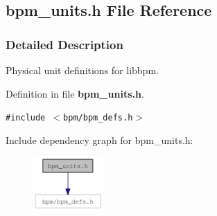\subsection{bpm\_\-units.h File Reference}
\label{bpm__units_8h}


\subsubsection{Detailed Description}
Physical unit definitions for libbpm. 



Definition in file {\bf bpm\_\-units.h}.

{\tt \#include $<$bpm/bpm\_\-defs.h$>$}\par


Include dependency graph for bpm\_\-units.h:\nopagebreak
\begin{figure}[H]
\begin{center}
\leavevmode
\includegraphics[width=75pt]{bpm__units_8h__incl}
\end{center}
\end{figure}
